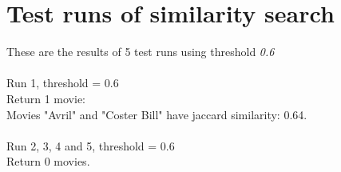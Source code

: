 
\section{Test runs of similarity search}
These are the results of 5 test runs using threshold \textit{0.6} \\ \\
Run 1, threshold = 0.6 \\
Return 1 movie: \\
Movies "Avril" and "Coster Bill" have jaccard similarity: 0.64. \\\\
Run 2, 3, 4 and 5, threshold = 0.6 \\
Return 0 movies. \\

